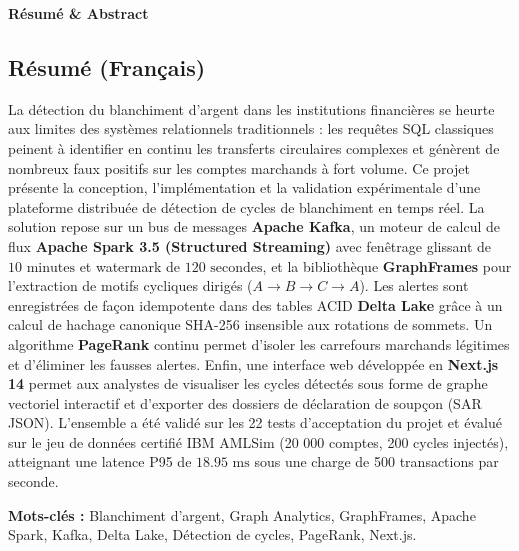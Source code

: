 
\thispagestyle{plain}
\begin{center}
    {\Large\bfseries\color{primaryNavy} Résumé \& Abstract}\\[0.4cm]
\end{center}

\vspace{-0.2cm}
\subsection*{Résumé (Français)}

La détection du blanchiment d'argent dans les institutions financières se heurte aux limites des systèmes relationnels traditionnels : les requêtes SQL classiques peinent à identifier en continu les transferts circulaires complexes et génèrent de nombreux faux positifs sur les comptes marchands à fort volume. Ce projet présente la conception, l'implémentation et la validation expérimentale d'une plateforme distribuée de détection de cycles de blanchiment en temps réel. La solution repose sur un bus de messages \textbf{Apache Kafka}, un moteur de calcul de flux \textbf{Apache Spark 3.5 (Structured Streaming)} avec fenêtrage glissant de $10\text{ minutes}$ et watermark de $120\text{ secondes}$, et la bibliothèque \textbf{GraphFrames} pour l'extraction de motifs cycliques dirigés ($A \to B \to C \to A$). Les alertes sont enregistrées de façon idempotente dans des tables ACID \textbf{Delta Lake} grâce à un calcul de hachage canonique SHA-256 insensible aux rotations de sommets. Un algorithme \textbf{PageRank} continu permet d'isoler les carrefours marchands légitimes et d'éliminer les fausses alertes. Enfin, une interface web développée en \textbf{Next.js 14} permet aux analystes de visualiser les cycles détectés sous forme de graphe vectoriel interactif et d'exporter des dossiers de déclaration de soupçon (SAR JSON). L'ensemble a été validé sur les 22 tests d'acceptation du projet et évalué sur le jeu de données certifié IBM AMLSim (20 000 comptes, 200 cycles injectés), atteignant une latence P95 de $18.95\text{ ms}$ sous une charge de 500 transactions par seconde.

\vspace{0.2cm}
\noindent\textbf{Mots-clés :} Blanchiment d'argent, Graph Analytics, GraphFrames, Apache Spark, Kafka, Delta Lake, Détection de cycles, PageRank, Next.js.

